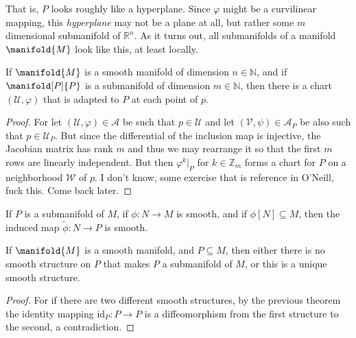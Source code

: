 \documentclass{article}                                                        %
\begin{document}
            That is, $P$ looks roughly like a hyperplane. Since $\varphi$ might
            be a curvilinear mapping, this \textit{hyperplane} may not be a
            plane at all, but rather some $m$ dimensional submanifold of
            $\mathbb{R}^{n}$. As it turns out, all submanifolds of a manifold
            $\manifold{M}$ look like this, at least locally.
            \begin{theorem}
                If $\manifold{M}$ is a smooth manifold of dimension
                $n\in\mathbb{N}$, and if $\manifold[P]{P}$ is a submanifold of
                dimension $m\in\mathbb{N}$, then there is a chart
                $(\mathcal{U},\varphi)$ that is adapted to $P$ at each point of
                $p$.
            \end{theorem}
            \begin{proof}
                For let $(\mathcal{U},\varphi)\in\mathcal{A}$ be such that
                $p\in\mathcal{U}$ and let $(\mathcal{V},\psi)\in\mathcal{A}_{P}$
                be also such that $p\in\mathcal{U}_{P}$. But since the
                differential of the inclusion map is injective, the Jacobian
                matrix has rank $m$ and thus we may rearrange it so that the
                first $m$ rows are linearly independent. But then
                $\varphi^{k}|_{P}$ for $k\in\mathbb{Z}_{m}$ forms a chart for
                $P$ on a neighborhood $\mathcal{W}$ of $p$. I don't know, some
                exercise that is reference in O'Neill, fuck this. Come back
                later.
            \end{proof}
            \begin{theorem}
                If $P$ is a submanifold of $M$, if $\phi:N\rightarrow{M}$ is
                smooth, and if $\phi[N]\subseteq{M}$, then the induced map
                $\tilde{\phi}:N\rightarrow{P}$ is smooth.
            \end{theorem}
            \begin{theorem}
                If $\manifold{M}$ is a smooth manifold, and $P\subseteq{M}$,
                then either there is no smooth structure on $P$ that makes $P$
                a submanifold of $M$, or this is a unique smooth structure.
            \end{theorem}
            \begin{proof}
                For if there are two different smooth structures, by the
                previous theorem the identity mapping
                $\textrm{id}_{P}:P\rightarrow{P}$ is a diffeomorphism from the
                first structure to the second, a contradiction.
            \end{proof}
\end{document}
